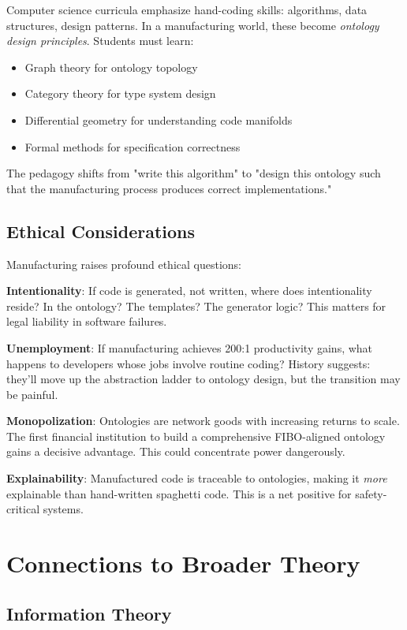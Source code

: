 Computer science curricula emphasize hand-coding skills: algorithms, data structures, design patterns. In a manufacturing world, these become \textit{ontology design principles}. Students must learn:

\begin{itemize}
    \item Graph theory for ontology topology
    \item Category theory for type system design
    \item Differential geometry for understanding code manifolds
    \item Formal methods for specification correctness
\end{itemize}

The pedagogy shifts from "write this algorithm" to "design this ontology such that the manufacturing process produces correct implementations."

\subsection{Ethical Considerations}

Manufacturing raises profound ethical questions:

\textbf{Intentionality}: If code is generated, not written, where does intentionality reside? In the ontology? The templates? The generator logic? This matters for legal liability in software failures.

\textbf{Unemployment}: If manufacturing achieves 200:1 productivity gains, what happens to developers whose jobs involve routine coding? History suggests: they'll move up the abstraction ladder to ontology design, but the transition may be painful.

\textbf{Monopolization}: Ontologies are network goods with increasing returns to scale. The first financial institution to build a comprehensive FIBO-aligned ontology gains a decisive advantage. This could concentrate power dangerously.

\textbf{Explainability}: Manufactured code is traceable to ontologies, making it \textit{more} explainable than hand-written spaghetti code. This is a net positive for safety-critical systems.

\section{Connections to Broader Theory}

\subsection{Information Theory}

